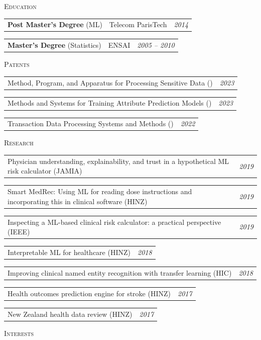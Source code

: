 \documentclass[letterpaper,11pt]{article}
\renewcommand{\section}[1]{
  {\scshape\color{blue}#1}{\color{blue}\hrulefill}{\vspace{0.2cm}}
}
\newcommand{\degree}[4]{
    \begin{tabular}{p{7cm}p{6cm}p{5cm}}
      \hspace{-0.7em} \textbf{\small{#1}} (\small{#2}) & \small{#3} & \hfill \textit{\small{#4}}
    \end{tabular}
}
\newcommand{\project}[4]{
    \begin{tabular}{p{17.4cm}p{1cm}}
      \hspace{-0.7em} \small{#1} (\small{#2}) & \hfill \textit{\small{#4}}
    \end{tabular}
}
\begin{document}
\section{Education}
\degree {Post Master's Degree}{ML}{Telecom ParisTech}{2014}
\degree {Master's Degree}{Statistics}{ENSAI}{2005 -- 2010}

{\vspace{0.3cm}}

\section{Patents}
\project {Method, Program, and Apparatus for Processing Sensitive Data}{}{}{2023}
\project {Methods and Systems for Training Attribute Prediction Models}{}{}{2023}
\project {Transaction Data Processing Systems and Methods}{}{}{2022}

{\vspace{0.3cm}}

\section{Research} 
\project {Physician understanding, explainability, and trust in a hypothetical ML risk calculator}{JAMIA}{}{2019}
\project {Smart MedRec: Using ML for reading dose instructions and incorporating this in clinical software}{HINZ}{}{2019}
\project {Inspecting a ML-based clinical risk calculator: a practical perspective}{IEEE}{}{2019}
\project {Interpretable ML for healthcare}{HINZ}{}{2018}
\project {Improving clinical named entity recognition with transfer learning}{HIC}{}{2018}
\project {Health outcomes prediction engine for stroke}{HINZ}{}{2017}
\project {New Zealand health data review}{HINZ}{}{2017}

{\vspace{0.3cm}}

\section{Interests}
\end{document}

